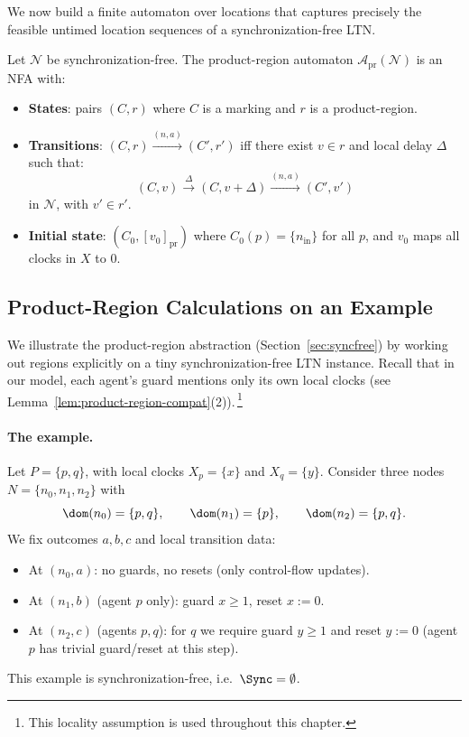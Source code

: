 We now build a finite automaton over locations that captures precisely the
feasible untimed location sequences of a synchronization-free LTN.

\begin{definition}
\label{def:pr-automaton}
Let $\mathcal{N}$ be synchronization-free. The \textsf{product-region automaton} $\mathcal{A}_{\text{pr}}(\mathcal{N})$ is an NFA with:
\begin{itemize}
\item \textbf{States}: pairs $(C, r)$ where $C$ is a marking and $r$ is a product-region.

\item \textbf{Transitions}: $(C, r) \xrightarrow{(n,a)} (C', r')$ iff there exist $v \in r$ and local delay $\Delta$ such that:
\[
(C, v) \xrightarrow{\Delta} (C, v + \Delta) \xrightarrow{(n,a)} (C', v')
\]
in $\mathcal{N}$, with $v' \in r'$.

\item \textbf{Initial state}: $(C_0, [v_0]_{\text{pr}})$ where $C_0(p) = \{n_{\text{in}}\}$ for all $p$, and $v_0$ maps all clocks in $X$ to 0.
\end{itemize}
\end{definition}


\subsection{Product-Region Calculations on an Example}
\label{subsec:explicit-pr-example}

We illustrate the product-region abstraction (Section~\ref{sec:syncfree}) by
working out regions explicitly on a tiny synchronization-free LTN instance.
Recall that in our model, each agent's guard mentions only its own local clocks
(see Lemma~\ref{lem:product-region-compat}(2)).\,\footnote{This locality
assumption is used throughout this chapter.}

\paragraph{The example.}
Let $P=\{p,q\}$, with local clocks $X_p=\{x\}$ and $X_q=\{y\}$.
Consider three nodes $N=\{n_0,n_1,n_2\}$ with
\[
\dom(n_0)=\{p,q\},\qquad \dom(n_1)=\{p\},\qquad \dom(n_2)=\{p,q\}.
\]
We fix outcomes $a,b,c$ and local transition data:
\begin{itemize}
\item At $(n_0,a)$: no guards, no resets (only control-flow updates).
\item At $(n_1,b)$ (agent $p$ only): guard $x \ge 1$, reset $x:=0$.
\item At $(n_2,c)$ (agents $p,q$): for $q$ we require guard $y \ge 1$ and reset $y:=0$
      (agent $p$ has trivial guard/reset at this step).
\end{itemize}
This example is synchronization-free, i.e.\ $\Sync=\emptyset$.

